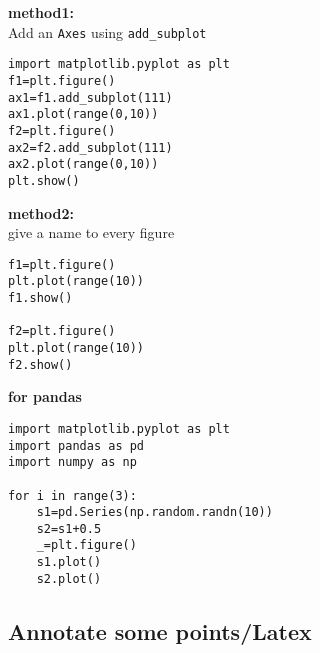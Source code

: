 \documentclass[11pt]{article}
\begin{document}
\textbf{method1:}\\
Add an \texttt{Axes} using \texttt{add\_subplot}

\begin{verbatim}
import matplotlib.pyplot as plt
f1=plt.figure()
ax1=f1.add_subplot(111)
ax1.plot(range(0,10))
f2=plt.figure()
ax2=f2.add_subplot(111)
ax2.plot(range(0,10))
plt.show()
\end{verbatim}

\textbf{method2:}\\
give a name to every figure

\begin{verbatim}
f1=plt.figure()
plt.plot(range(10))
f1.show()

f2=plt.figure()
plt.plot(range(10))
f2.show()
\end{verbatim}

\textbf{for pandas}

\begin{verbatim}
import matplotlib.pyplot as plt
import pandas as pd
import numpy as np

for i in range(3):
    s1=pd.Series(np.random.randn(10))
    s2=s1+0.5
    _=plt.figure()
    s1.plot()
    s2.plot()
\end{verbatim}

    \hypertarget{annotate-some-pointslatex}{%
\subsection{Annotate some
points/Latex}\label{annotate-some-pointslatex}}
\end{document}
